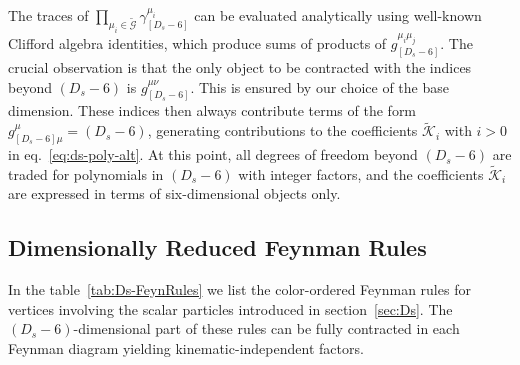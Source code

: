 The traces of $\prod_{\mu_i\in\tilde{\mathcal{G}}}\gamma^{\mu_i}_{[D_s-6]}$ can be 
evaluated analytically using well-known Clifford algebra identities,
which produce sums of products of $g^{\mu_i\mu_j}_{[D_s-6]}$.
%
The crucial observation is that the only object to be contracted with the indices beyond 
$(D_s-6)$ is $g^{\mu\nu}_{[D_s-6]}$.
This is ensured by our choice of the base dimension.
These indices then always contribute terms of the form $g^\mu_{[D_s-6]\mu} = (D_s-6)$, 
generating contributions to the coefficients $\tilde{\mathcal{K}}_i$ with $i>0$ 
in eq.~\eqref{eq:ds-poly-alt}. At this point, all degrees of freedom beyond $(D_s-6)$
are traded for polynomials in $(D_s-6)$ with integer factors, and the coefficients
$\tilde{\mathcal{K}}_i$ are expressed in terms of six-dimensional objects only.

\subsection{Dimensionally Reduced Feynman Rules}
\label{sec:DsFeynRules}
In the table~\ref{tab:Ds-FeynRules} we list the color-ordered Feynman rules for vertices involving the scalar particles introduced in section~\ref{sec:Ds}.
The $(D_s-6)$-dimensional part of these rules can be fully contracted in each Feynman diagram yielding kinematic-independent factors.
